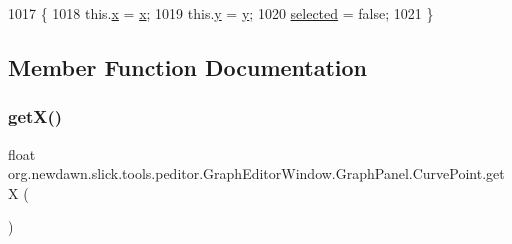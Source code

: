 \begin{DoxyCode}
1017                                                 \{
1018                 this.\mbox{\hyperlink{classorg_1_1newdawn_1_1slick_1_1tools_1_1peditor_1_1_graph_editor_window_1_1_graph_panel_1_1_curve_point_a047a6ee9ca0a301f32471ca8dbff20fe}{x}} = \mbox{\hyperlink{classorg_1_1newdawn_1_1slick_1_1tools_1_1peditor_1_1_graph_editor_window_1_1_graph_panel_1_1_curve_point_a047a6ee9ca0a301f32471ca8dbff20fe}{x}};
1019                 this.\mbox{\hyperlink{classorg_1_1newdawn_1_1slick_1_1tools_1_1peditor_1_1_graph_editor_window_1_1_graph_panel_1_1_curve_point_a192de23a4a5d1bdcdb9599de910cc4e5}{y}} = \mbox{\hyperlink{classorg_1_1newdawn_1_1slick_1_1tools_1_1peditor_1_1_graph_editor_window_1_1_graph_panel_1_1_curve_point_a192de23a4a5d1bdcdb9599de910cc4e5}{y}};
1020                 \mbox{\hyperlink{classorg_1_1newdawn_1_1slick_1_1tools_1_1peditor_1_1_graph_editor_window_1_1_graph_panel_1_1_curve_point_a606ae5d752030e493c64a1422f42ba17}{selected}} = \textcolor{keyword}{false};
1021             \}
\end{DoxyCode}


\subsection{Member Function Documentation}
\mbox{\label{classorg_1_1newdawn_1_1slick_1_1tools_1_1peditor_1_1_graph_editor_window_1_1_graph_panel_1_1_curve_point_a9b2de302e69598357b1d1cb779bb0381}} 
\subsubsection{\texorpdfstring{get\+X()}{getX()}}
{\footnotesize\ttfamily float org.\+newdawn.\+slick.\+tools.\+peditor.\+Graph\+Editor\+Window.\+Graph\+Panel.\+Curve\+Point.\+getX (\begin{DoxyParamCaption}{ }\end{DoxyParamCaption})\hspace{0.3cm}{\ttfamily [inline]}}

